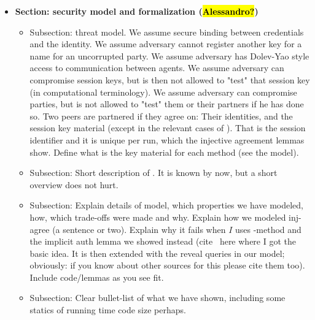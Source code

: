 \documentclass[runningheads]{llncs}
\begin{document}
{\begin{itemize}
\begin{itemize}
             \item Describe negotiation of method.
             \item Describe transmission of aux data and expected security
                 properties.
        \end{itemize}
    \item \textbf{Section: \mEdhoc security model and formalization (\hl{Alessandro?})}
        \begin{itemize}
            \item Subsection: threat model. We assume secure binding between
                credentials and the identity. We assume adversary cannot
                register another key for a name for an uncorrupted party. We
                assume adversary has Dolev-Yao style access to communication
                between agents. We assume adversary can compromise session keys,
                but is then not allowed to "test" that session key (in
                computational terminology). We assume adversary can compromise
                parties, but is not allowed to "test" them or their partners if
                he has done so. Two peers are partnered if they agree on: Their
                identities, and the session key material (except \mGiy in the
                relevant cases of \mStat). That is the session identifier and it
                is unique per run, which the injective agreement lemmas show.
                Define what is the key material for each method
                (see the \mTamarin model).
            \item Subsection: Short description of \mTamarin. It is known by
                now, but a short overview does not hurt.
            \item Subsection: Explain details of model, which properties we have
                modeled, how, which trade-offs were made and why.
                Explain how we modeled inj-agree (a sentence or two). Explain
                why it fails when $I$ uses \mStat-method and the implicit auth
                lemma we showed instead
                (cite~\cite{DBLP:journals/iacr/GuilhemFW19} here where I got the
                basic idea. It is then extended with the reveal queries in our
                model; obviously: if you know about other sources for this
                please cite them too). Include code/lemmas as you see fit.
            \item Subsection: Clear bullet-list of what we have shown, including
                some statics of running time code size perhaps.

\end{itemize}
\end{itemize}}
\end{document}
